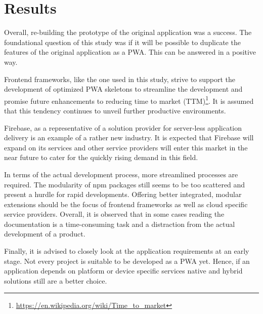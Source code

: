 \chapter{Results}

Overall, re-building the prototype of the original application was a success. The foundational question of this study was if it will be possible to duplicate the features of the original application as a PWA. This can be answered in a positive way.

Frontend frameworks, like the one used in this study, strive to support the development of optimized PWA skeletons to streamline the development and promise future enhancements to reducing time to market (TTM)\footnote{\url{https://en.wikipedia.org/wiki/Time_to_market}}. It is assumed that this tendency continues to unveil further productive environments.

Firebase, as a representative of a solution provider for server-less application delivery is an example of a rather new industry. It is expected that Firebase will expand on its services and other service providers will enter this market in the near future to cater for the quickly rising demand in this field.

In terms of the actual development process, more streamlined processes are required. The modularity of npm packages still seems to be too scattered and present a hurdle for rapid developments. Offering better integrated, modular extensions should be the focus of frontend frameworks as well as cloud specific service providers. Overall, it is observed that in some cases reading the documentation is a time-consuming task and a distraction from the actual development of a product.

Finally, it is advised to closely look at the application requirements at an early stage. Not every project is suitable to be developed as a PWA yet. Hence, if an application depends on platform or device specific services native and hybrid solutions still are a better choice.
